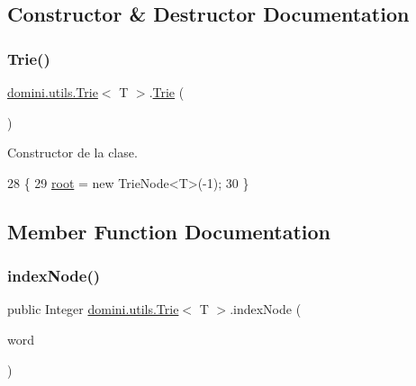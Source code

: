\subsection{Constructor \& Destructor Documentation}
\mbox{\label{classdomini_1_1utils_1_1Trie_aa47b21b235e9dab115f3f97726837d5f}} 
\subsubsection{\texorpdfstring{Trie()}{Trie()}}
{\footnotesize\ttfamily \hyperlink{classdomini_1_1utils_1_1Trie}{domini.\+utils.\+Trie}$<$ T $>$.\hyperlink{classdomini_1_1utils_1_1Trie}{Trie} (\begin{DoxyParamCaption}{ }\end{DoxyParamCaption})\hspace{0.3cm}{\ttfamily [inline]}}



Constructor de la clase. 


\begin{DoxyCode}
28                   \{
29         \hyperlink{classdomini_1_1utils_1_1Trie_a60ef63a6c55d07710d33892ccc899bce}{root} = \textcolor{keyword}{new} TrieNode<T>(-1);
30     \}
\end{DoxyCode}


\subsection{Member Function Documentation}
\mbox{\label{classdomini_1_1utils_1_1Trie_a5c30e36df9ab804bbc054805358ecf2a}} 
\subsubsection{\texorpdfstring{index\+Node()}{indexNode()}}
{\footnotesize\ttfamily public Integer \hyperlink{classdomini_1_1utils_1_1Trie}{domini.\+utils.\+Trie}$<$ T $>$.index\+Node (\begin{DoxyParamCaption}\item[{Array\+List$<$ T $>$}]{word }\end{DoxyParamCaption})\hspace{0.3cm}{\ttfamily [inline]}}



